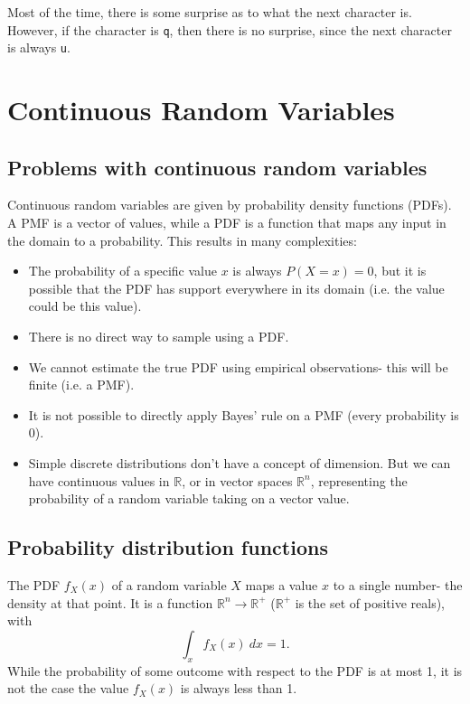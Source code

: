 \documentclass[a4paper, openany]{memoir}
\begin{document}
\noindent Most of the time, there is some surprise as to what the next character is. However, if the character is \texttt{q}, then there is no surprise, since the next character is always \texttt{u}.
\newpage

\section{Continuous Random Variables}
\subsection{Problems with continuous random variables}
Continuous random variables are given by probability density functions (PDFs). A PMF is a vector of values, while a PDF is a function that maps any input in the domain to a probability. This results in many complexities:
\begin{itemize}
    \item The probability of a specific value $x$ is always $P(X = x) = 0$, but it is possible that the PDF has support everywhere in its domain (i.e. the value could be this value).
    \item There is no direct way to sample using a PDF.
    \item We cannot estimate the true PDF using empirical observations- this will be finite (i.e. a PMF).
    \item It is not possible to directly apply Bayes' rule on a PMF (every probability is 0).
    \item Simple discrete distributions don't have a concept of dimension. But we can have continuous values in $\mathbb{R}$, or in vector spaces $\mathbb{R}^n$, representing the probability of a random variable taking on a vector value.
\end{itemize}

\subsection{Probability distribution functions}
The PDF $f_X(x)$ of a random variable $X$ maps a value $x$ to a single number- the density at that point. It is a function $\mathbb{R}^n \to \mathbb{R}^+$ ($\mathbb{R}^+$ is the set of positive reals), with
\[\int_x f_X(x) \ dx = 1.\]
While the probability of some outcome with respect to the PDF is at most 1, it is not the case the value $f_X(x)$ is always less than 1.
\end{document}
